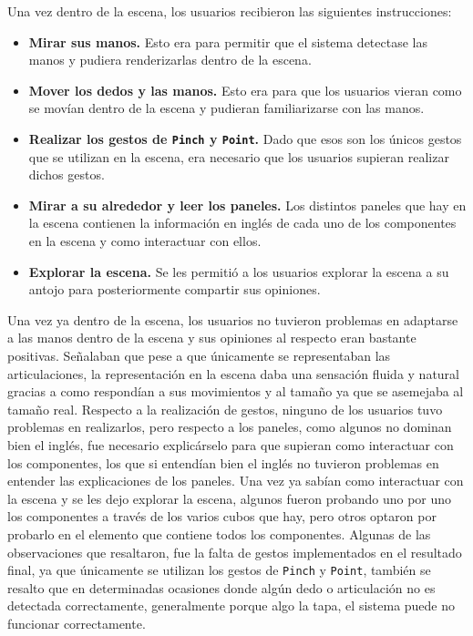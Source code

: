 \documentclass[a4paper, 12pt]{book}
\begin{document}
Una vez dentro de la escena, los usuarios recibieron las siguientes instrucciones: 

\begin{itemize}
  \item \textbf{Mirar sus manos.} Esto era para permitir que el sistema detectase las manos y pudiera renderizarlas dentro de la escena.
  \item \textbf{Mover los dedos y las manos.} Esto era para que los usuarios vieran como se movían dentro de la escena y pudieran familiarizarse con las manos.
  \item \textbf{Realizar los gestos de \texttt{Pinch} y \texttt{Point}.} Dado que esos son los únicos gestos que se utilizan en la escena, era necesario que los usuarios supieran realizar dichos gestos.
  \item \textbf{Mirar a su alrededor y leer los paneles.} Los distintos paneles que hay en la escena contienen la información en inglés de cada uno de los componentes en la escena y como interactuar con ellos.
  \item \textbf{Explorar la escena.} Se les permitió a los usuarios explorar la escena a su antojo para posteriormente compartir sus opiniones.
\end{itemize}

Una vez ya dentro de la escena, los usuarios no tuvieron problemas en adaptarse a las manos dentro de la escena y sus opiniones al respecto eran bastante positivas. Señalaban que pese a que únicamente se representaban las articulaciones, la representación en la escena daba una sensación fluida y natural gracias a como respondían a sus movimientos y al tamaño ya que se asemejaba al tamaño real. 
Respecto a la realización de gestos, ninguno de los usuarios tuvo problemas en realizarlos, pero respecto a los paneles, como algunos no dominan bien el inglés, fue necesario explicárselo para que supieran como interactuar con los componentes, los que si entendían bien el inglés no tuvieron problemas en entender las explicaciones de los paneles. 
Una vez ya sabían como interactuar con la escena y se les dejo explorar la escena, algunos fueron probando uno por uno los componentes a través de los varios cubos que hay, pero otros optaron por probarlo en el elemento que contiene todos los componentes. 
Algunas de las observaciones que resaltaron, fue la falta de gestos implementados en el resultado final, ya que únicamente se utilizan los gestos de \texttt{Pinch} y \texttt{Point}, también se resalto que en determinadas ocasiones donde algún dedo o articulación no es detectada correctamente, generalmente porque algo la tapa, el sistema puede no funcionar correctamente.
\end{document}
